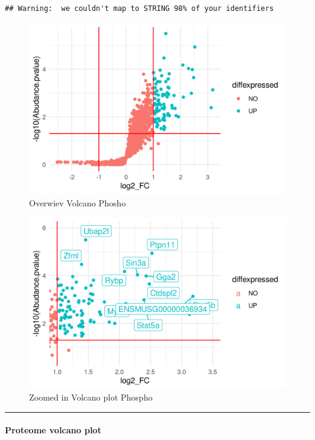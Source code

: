 \documentclass[
]{article}
\begin{document}
\begin{verbatim}
## Warning:  we couldn't map to STRING 98% of your identifiers
\end{verbatim}

\begin{figure}
\centering
\includegraphics{images/Zoomed_out_Volcano.png}
\caption{Overwiev Volcano Phosho}
\end{figure}

\begin{figure}
\centering
\includegraphics{images/Zoomed_in_Volcano.png}
\caption{Zoomed in Volcano plot Phospho}
\end{figure}

\begin{center}\rule{0.5\linewidth}{0.5pt}\end{center}

\hypertarget{proteome-volcano-plot}{%
\paragraph{Proteome volcano plot}\label{proteome-volcano-plot}}
\end{document}
